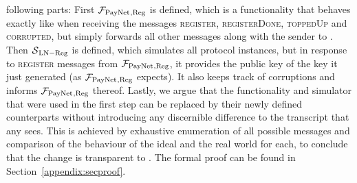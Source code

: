   following parts: First $\mathcal{F}_{\mathrm{PayNet}}{}_{\mathrm{, Reg}}$ is defined, which is a
  functionality that behaves exactly like \fpaynet{} when receiving the messages
  \textsc{register}, \textsc{registerDone}, \textsc{toppedUp} and
  \textsc{corrupted}, but simply forwards all other messages along with the
  sender to \simulator. Then $\mathcal{S}{}_{\mathrm{LN - Reg}}$ is defined,
  which simulates all protocol instances, but in response to \textsc{register}
  messages from $\mathcal{F}_{\mathrm{PayNet}}{}_{\mathrm{, Reg}}$, it provides the public key of the
  key it just generated (as $\mathcal{F}_{\mathrm{PayNet}}{}_{\mathrm{, Reg}}$ expects). It also
  keeps track of corruptions and informs $\mathcal{F}_{\mathrm{PayNet}}{}_{\mathrm{, Reg}}$ thereof.
  Lastly, we argue that the functionality and simulator that were used in  the
  first step can be replaced by their newly defined counterparts without
  introducing any discernible difference to the transcript that any
  \environment{} sees. This is achieved by exhaustive enumeration of all
  possible messages and comparison of the behaviour of the ideal and the real
  world for each, to conclude that the change is transparent to \environment.
  The formal proof can be found in Section~\ref{appendix:secproof}.
